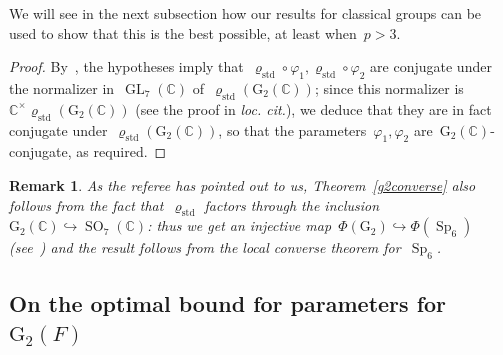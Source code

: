 \documentclass[12pt]{amsart}
\newcommand{\GL}{\operatorname{GL}}
\newcommand{\SO}{\operatorname{SO}}
\newcommand{\G}{\mathrm{G}}
\newcommand{\Sp}{\operatorname{Sp}}
\def\rhostd{\varrho_{\mathrm{std}}} %
\newtheorem{rmk}[thm]{Remark}
\newtheorem{rmk}[equation]{Remark}
\begin{document}
We will see in the next subsection how our results for classical groups can be used to show that this is the best possible, at least when~$p>3$.

\begin{proof}
By~\cite[Theorem~8.2(b)]{M24}, the hypotheses imply that~$\rhostd\circ\varphi_1,\rhostd\circ \varphi_2$ are conjugate under the normalizer in~$\GL_7(\mathbb{C})$ of~$\rhostd(\G_2(\mathbb C))$; since this normalizer is~$\mathbb{C}^\times\rhostd(\G_2(\mathbb C))$ (see the proof in \emph{loc. cit.}), we deduce that they are in fact conjugate under~$\rhostd(\G_2(\mathbb C))$, so that the parameters~$\varphi_1,\varphi_2$ are~$\G_2(\mathbb{C})$-conjugate, as required. 
\end{proof}

\begin{rmk} 
As the referee has pointed out to us, Theorem~\ref{g2converse} also follows from the fact that~$\rhostd$ factors through the inclusion~$\G_2(\mathbb C)\hookrightarrow\SO_7(\mathbb C)$: thus we get an injective map~$\Phi(\G_2)\hookrightarrow\Phi(\Sp_6)$ (see~\cite[Lemma~2.3(ii)]{GS23a}) and the result follows from the local converse theorem for~$\Sp_6$.
\end{rmk}

\subsection{On the optimal bound for parameters for $\G_2(F)$}\label{g2parameters}
\end{document}
